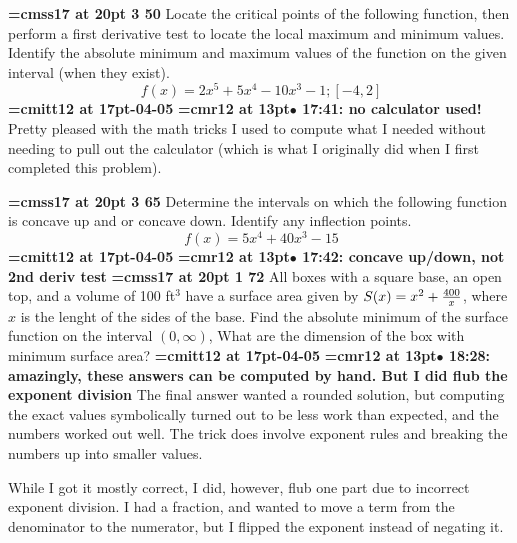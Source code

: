 {\medskip\noindent\bf\font\titlefont=cmss17 at 20pt 3 50}\medskip
Locate the critical points of the following function, then
perform a first derivative test to locate the local maximum and
minimum values. Identify the absolute minimum and maximum values
of the function on the given interval (when they exist).
$$\
f(x) = 2x^5 + 5x^4 - 10x^3 -1; [-4, 2]
$$
{\medskip\noindent\bf\font\titlefont=cmitt12 at 17pt-04-05}\medskip
{\smallskip\noindent\bf\font\titlefont=cmr12 at 13pt\titlefont $\bullet$ 17:41: no calculator used!}\smallskip
Pretty pleased with the math tricks I used to compute what I needed without needing to pull out the calculator (which is what I originally did when I first completed this problem).
\par

{\medskip\noindent\bf\font\titlefont=cmss17 at 20pt 3 65}\medskip
Determine the intervals on which the following function is
concave up and or concave down. Identify any inflection points.
$$\
f(x) = 5x^4 + 40x^3 - 15
$$
{\medskip\noindent\bf\font\titlefont=cmitt12 at 17pt-04-05}\medskip
{\smallskip\noindent\bf\font\titlefont=cmr12 at 13pt\titlefont $\bullet$ 17:42: concave up/down, not 2nd deriv test}\smallskip
\xrdef{node121}
{\medskip\noindent\bf\font\titlefont=cmss17 at 20pt\titlefont 4 1 72}\medskip
All boxes with a square base, an open top, and a volume of
100 ft$^3$ have a surface area given by $S(x) = x^2 + {400 \over x}$,
where $x$ is the lenght of the sides of the base. Find the
absolute minimum of the surface function on the interval
$(0, \infty)$, What are the dimension of the box with minimum surface
area?
{\medskip\noindent\bf\font\titlefont=cmitt12 at 17pt\titlefont 2026-04-05}\medskip
{\smallskip\noindent\bf\font\titlefont=cmr12 at 13pt\titlefont $\bullet$ 18:28: amazingly, these answers can be computed by hand. But I did flub the exponent division}\smallskip
The final answer wanted a rounded solution, but computing the exact values symbolically turned out to be less work than expected, and the numbers worked out well. The trick does involve exponent rules and breaking the numbers up into smaller values.
\par

While I got it mostly correct, I did, however, flub one part due to incorrect exponent division. I had a fraction, and wanted to move a term from the denominator to the numerator, but I flipped the exponent instead of negating it.
\par

